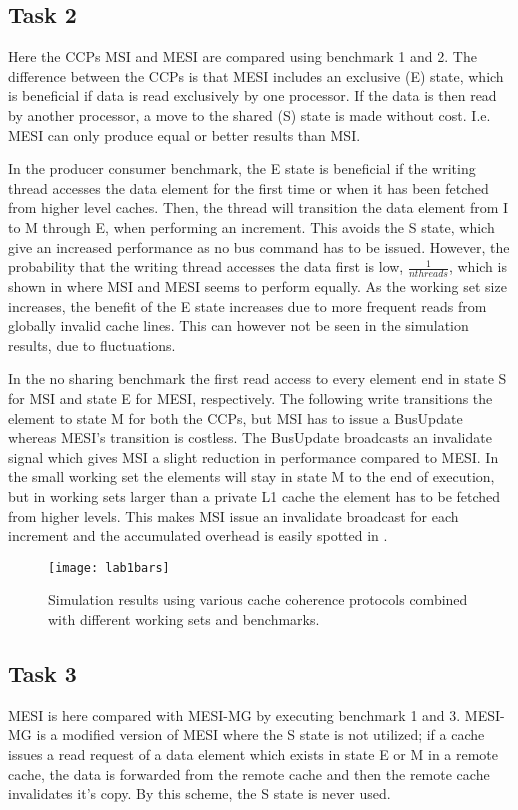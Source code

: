 \subsection{Task 2}
\label{sec:lab12}
Here the CCPs MSI and MESI are compared using benchmark 1 and 2. The difference between the CCPs is that MESI includes an exclusive (E) state, which is beneficial if data is read exclusively by one processor. If the data is then read by another processor, a move to the shared (S) state is made without cost. I.e. MESI can only produce equal or better results than MSI.

In the producer consumer benchmark, the E state is beneficial if the writing thread accesses the data element for the first time or when it has been fetched from higher level caches. Then, the thread will transition the data element from I to M through E, when performing an increment. This avoids the S state, which give an increased performance as no bus command has to be issued. However, the probability that the writing thread accesses the data first is low, $\frac{1}{nthreads}$, which is shown in  where MSI and MESI seems to perform equally. As the working set size increases, the benefit of the E state increases due to more frequent reads from globally invalid cache lines. This can however not be seen in the simulation results, due to fluctuations.

In the no sharing benchmark the first read access to every element end in state S for MSI and state E for MESI, respectively. The following write transitions the element to state M for both the CCPs, but MSI has to issue a BusUpdate whereas MESI's transition is costless. The BusUpdate broadcasts an invalidate signal which gives MSI a slight reduction in performance compared to MESI. In the small working set the elements will stay in state M to the end of execution, but in working sets larger than a private L1 cache the element has to be fetched from higher levels. This makes MSI issue an invalidate broadcast for each increment and the accumulated overhead is easily spotted in . 

\begin{figure}[t]
	\center
	\texttt{[image: lab1bars]}
	\caption{Simulation results using various cache coherence protocols combined with different working sets and benchmarks.}
	\label{fig:lab1bars}
\end{figure}

\subsection{Task 3}
\label{sec:lab13}
MESI is here compared with MESI-MG by executing benchmark 1 and 3. MESI-MG is a modified version of MESI where the S state is not utilized; if a cache issues a read request of a data element which exists in state E or M in a remote cache, the data is forwarded from the remote cache and then the remote cache invalidates it's copy. By this scheme, the S state is never used.

